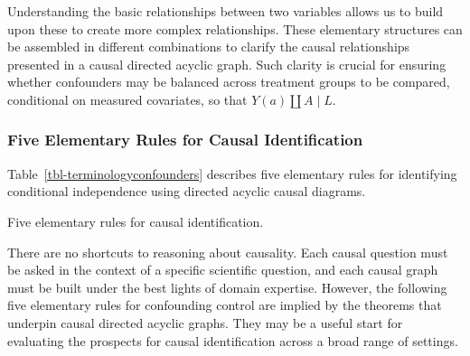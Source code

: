 \documentclass[
  single column]{article}
\begin{document}
Understanding the basic relationships between two variables allows us to
build upon these to create more complex relationships. These elementary
structures can be assembled in different combinations to clarify the
causal relationships presented in a causal directed acyclic graph. Such
clarity is crucial for ensuring whether confounders may be balanced
across treatment groups to be compared, conditional on measured
covariates, so that \(Y(a) \coprod A \mid L\).

\newpage{}

\subsubsection{Five Elementary Rules for Causal
Identification}\label{five-elementary-rules-for-causal-identification}

Table~\ref{tbl-terminologyconfounders} describes five elementary rules
for identifying conditional independence using directed acyclic causal
diagrams.

\begin{table}

\caption{\label{tbl-terminologyconfounders}Five elementary rules for
causal identification.}

\centering{

\terminologyelconfounders

}

\end{table}%

There are no shortcuts to reasoning about causality. Each causal
question must be asked in the context of a specific scientific question,
and each causal graph must be built under the best lights of domain
expertise. However, the following five elementary rules for confounding
control are implied by the theorems that underpin causal directed
acyclic graphs. They may be a useful start for evaluating the prospects
for causal identification across a broad range of settings.
\end{document}
